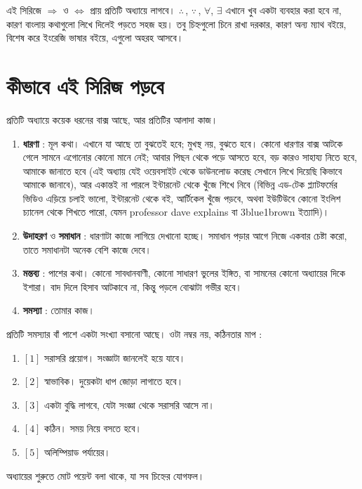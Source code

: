 \documentclass[11pt]{article}
\begin{document}
\begin{remark}
এই সিরিজে $\Rightarrow$ ও $\Leftrightarrow$ প্রায় প্রতিটি অধ্যায়ে লাগবে।
$\therefore\,$, $\because\,$, $\forall$, $\exists$ এখানে খুব একটা ব্যবহার করা হবে
না, কারণ বাংলায় কথাগুলো লিখে দিলেই পড়তে সহজ হয়। তবু চিহ্নগুলো চিনে রাখা
দরকার, কারণ অন্য ম্যাথ বইয়ে, বিশেষ করে ইংরেজি ভাষার বইয়ে, এগুলো অহরহ আসবে।
\end{remark}

\section{কীভাবে এই সিরিজ পড়বে}

\noindent
প্রতিটি অধ্যায়ে কয়েক ধরনের বাক্স আছে, আর প্রতিটির আলাদা কাজ।

\begin{idea}[বাক্সগুলো অর্থ]
\begin{enumerate}
  \item \textbf{ধারণা} : মূল কথা। এখানে যা আছে তা বুঝতেই হবে; মুখস্থ নয়, বুঝতে হবে।
        কোনো ধারণার বাক্স আটকে গেলে সামনে এগোনোর কোনো মানে নেই; আবার পিছন থেকে পড়ে আসতে হবে, বড় কারও সাহায্য নিতে হবে, আমাকে জানাতে হবে (এই অধ্যায় যেই ওয়েবসাইট  থেকে ডাউনলোড করেছ সেখানে লিখে দিয়েছি কিভাবে আমাকে জানাবে), আর একান্তই না পারলে ইন্টারনেট থেকে খুঁজে শিখে নিবে (বিভিন্ন এড-টেক প্ল্যাটফর্মের ভিডিও এড়িয়ে চলাই ভালো, ইন্টারনেট থেকে বই, আর্টিকেল খুঁজে পড়বে, অথবা ইউটিউবে কোনো ইংলিশ চ্যানেল থেকে শিখতে পারো, যেমন professor dave explains বা 3blue1brown ইত্যাদি)।
  \item \textbf{উদাহরণ} ও \textbf{সমাধান} : ধারণাটা কাজে লাগিয়ে দেখানো হচ্ছে।
        সমাধান পড়ার আগে নিজে একবার চেষ্টা করো, তাতে সমাধানটা অনেক বেশি কাজে দেবে।
  \item \textbf{মন্তব্য} : পাশের কথা। কোনো সাবধানবাণী, কোনো সাধারণ ভুলের ইঙ্গিত,
        বা সামনের কোনো অধ্যায়ের দিকে ইশারা। বাদ দিলে হিসাব আটকাবে না, কিন্তু
        পড়লে বোঝাটা গভীর হবে।
  \item \textbf{সমস্যা} : তোমার কাজ।
\end{enumerate}
\end{idea}

\begin{idea}[{[N] এর অর্থ}] 
প্রতিটি সমস্যার বাঁ পাশে একটা সংখ্যা বসানো আছে। ওটা নম্বর নয়, কঠিনতার মাপ :

\begin{enumerate}
  \item $[1]$ সরাসরি প্রয়োগ। সংজ্ঞাটা জানলেই হয়ে যাবে।
  \item $[2]$ স্বাভাবিক। দুয়েকটা ধাপ জোড়া লাগাতে হবে।
  \item $[3]$ একটা বুদ্ধি লাগবে, যেটা সংজ্ঞা থেকে সরাসরি আসে না।
  \item $[4]$ কঠিন। সময় নিয়ে বসতে হবে।
  \item $[5]$ অলিম্পিয়াড পর্যায়ের।
\end{enumerate}

\noindent
অধ্যায়ের শুরুতে মোট পয়েন্ট বলা থাকে, যা সব চিহ্নের যোগফল।
\end{idea}
\end{document}
